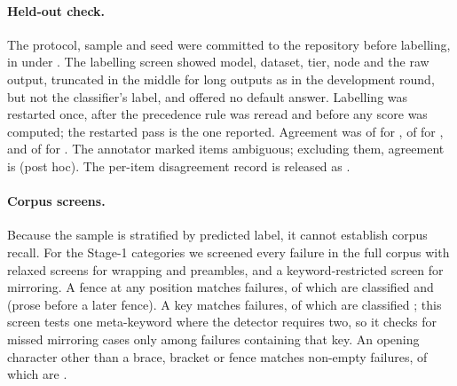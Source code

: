 \paragraph{Held-out check.}
The protocol, sample and seed were committed to the repository before
labelling, in  under .
The labelling screen showed model, dataset, tier, node and the raw output, truncated in the middle
for long outputs as in the development round, but not the classifier's
label, and offered no default answer. Labelling was restarted once, after
the precedence rule was reread and before any score was computed; the
restarted pass is the one reported. Agreement was
 of 
for ,  of
 for , and
 of 
for . The annotator marked 
items ambiguous; excluding them, agreement is
 (post hoc). The per-item disagreement
record is released as .

\begin{table}[ht]
\centering\small
\caption{Corrected classifier against unadjudicated development labels
($n=\pn{validation.n}$), full corpus frame. Recall is computed within the
label-stratified sample, not over the corpus.}
\label{tab:validation}
\end{table}

\paragraph{Corpus screens.}
Because the sample is stratified by predicted label, it cannot establish
corpus recall. For the Stage-1 categories we screened every failure in the full corpus
with relaxed screens for wrapping and preambles, and a keyword-restricted
screen for mirroring. A fence at
any position matches  failures, of which
 are classified 
and   (prose
before a later fence). A  key matches
 failures, of which
 are classified
; this screen tests one meta-keyword where the
detector requires two, so it checks for missed mirroring cases only among
failures containing that key. An opening character other than a brace, bracket or fence
matches  non-empty failures, of which
 are .


